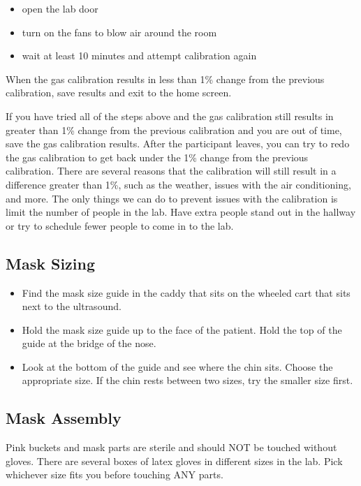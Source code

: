 \documentclass[
]{book}
\providecommand{\tightlist}{%
  \setlength{\itemsep}{0pt}\setlength{\parskip}{0pt}}
\begin{document}
\begin{itemize}
\tightlist
\item
  open the lab door
\item
  turn on the fans to blow air around the room
\item
  wait at least 10 minutes and attempt calibration again
\end{itemize}

When the gas calibration results in less than 1\% change from the previous calibration, save results and exit to the home screen.

If you have tried all of the steps above and the gas calibration still results in greater than 1\% change from the previous calibration and you are out of time, save the gas calibration results. After the participant leaves, you can try to redo the gas calibration to get back under the 1\% change from the previous calibration. There are several reasons that the calibration will still result in a difference greater than 1\%, such as the weather, issues with the air conditioning, and more. The only things we can do to prevent issues with the calibration is limit the number of people in the lab. Have extra people stand out in the hallway or try to schedule fewer people to come in to the lab.

\hypertarget{Parvo-MaskSizing}{%
\subsection{Mask Sizing}\label{Parvo-MaskSizing}}

\begin{itemize}
\tightlist
\item
  Find the mask size guide in the caddy that sits on the wheeled cart that sits next to the ultrasound.
\item
  Hold the mask size guide up to the face of the patient. Hold the top of the guide at the bridge of the nose.
\item
  Look at the bottom of the guide and see where the chin sits. Choose the appropriate size. If the chin rests between two sizes, try the smaller size first.
\end{itemize}

\hypertarget{Parvo-MaskAssembly}{%
\subsection{Mask Assembly}\label{Parvo-MaskAssembly}}

Pink buckets and mask parts are sterile and should NOT be touched without gloves. There are several boxes of latex gloves in different sizes in the lab. Pick whichever size fits you before touching ANY parts.
\end{document}
